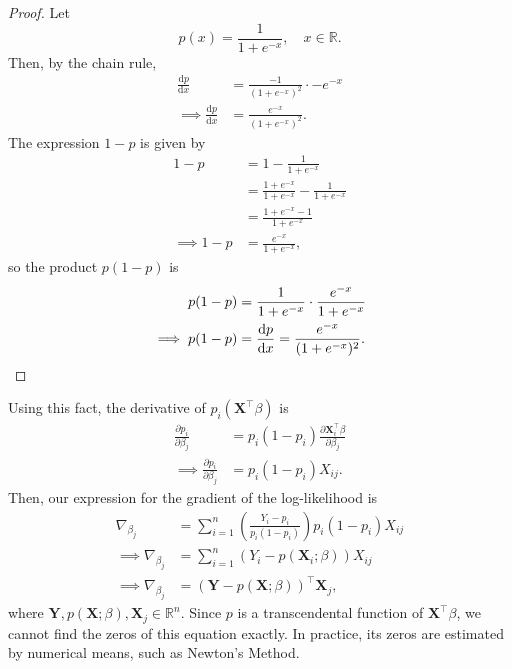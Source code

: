 \documentclass[letterpaper, reqno]{amsart}
\numberwithin{equation}{section}
\newcommand{\T}{\top} %
\newcommand{\vect}[1]{\boldsymbol{\mathbf{#1}}} %
\newcommand{\dd}{\mathrm{d}}
\newcommand{\ddx}[2]{\frac{\dd #1}{\dd #2}}
\newcommand{\ppx}[2]{\frac{\partial #1}{\partial #2}}
\newcommand{\R}{\mathbb{R}}  %
\newcommand{\sumi}[2]{\sum_{#1=1}^{#2}}
\newcommand{\Xm}{\vect{X}}
\newcommand{\Yv}{\vect{Y}}
\newcommand{\Xv}{\vect{X}}
\newcommand{\Bv}{\beta}
\begin{document}
\begin{proof}
  Let
  \[ p(x) = \frac{1}{1 + e^{-x}}, \quad x \in \R. \]
  Then, by the chain rule,
  \begin{align*}
    \ddx{p}{x} &= \frac{-1}{(1 + e^{-x})^2} \cdot -e^{-x} \\
    \implies \ddx{p}{x} &= \frac{e^{-x}}{(1 + e^{-x})^2}.
  \end{align*}
  The expression $1 - p$ is given by
  \begin{align*}
    1-p &= 1 - \frac{1}{1 + e^{-x}} \\
    &= \frac{1 + e^{-x}}{1 + e^{-x}} - \frac{1}{1 + e^{-x}} \\
    &= \frac{1 + e^{-x} - 1}{1 + e^{-x}} \\
    \implies 1 - p &= \frac{e^{-x}}{1 + e^{-x}},
  \end{align*}
  so the product $p(1-p)$ is
  \begin{align*}
    p(1-p) &= \frac{1}{1+e^{-x}} \cdot \frac{e^{-x}}{1 + e^{-x}} \\
    \implies p(1-p) &= \ddx{p}{x} = \frac{e^{-x}}{(1 + e^{-x})^2}. \qedhere
  \end{align*}
\end{proof}
Using this fact, the derivative of $p_i(\Xv^\T\Bv)$ is
\begin{align*}
  \ppx{p_i}{\Bv_j} &= p_i(1 - p_i) \ppx{\Xv_i^\T\Bv}{\Bv_j} \\
  \implies \ppx{p_i}{\Bv_j} &= p_i(1 - p_i) X_{ij}.
\end{align*}
Then, our expression for the gradient of the log-likelihood is 
\begin{align*}
  \nabla_{\Bv_j} &= \sumi{i}{n} \left( \frac{Y_i - p_i}{p_i(1 - p_i)} \right) p_i(1 - p_i) X_{ij} \\
  \implies \nabla_{\Bv_j} &= \sumi{i}{n} \left( Y_i - p(\Xv_i; \Bv) \right) X_{ij} \\
  \implies \nabla_{\Bv_j} &= \left( \Yv - p(\Xv; \Bv) \right)^\T \Xv_j,
\end{align*}
where $\Yv, p(\Xm; \Bv), \Xv_j \in \R^n$.
Since $p$ is a transcendental function of $\Xv^\T\Bv$, we cannot find the zeros of
this equation exactly. In practice, its zeros are estimated by numerical means,
such as Newton's Method.
\end{document}
